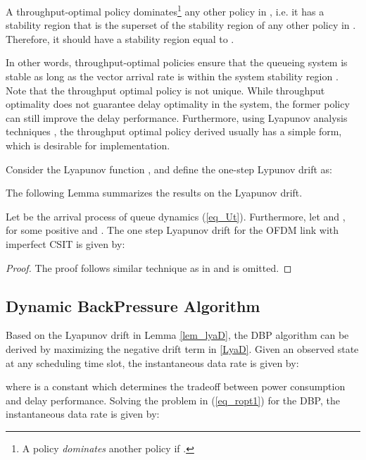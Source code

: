 \documentclass[11pt,journal, onecolumn]{./IEEEtran}
\newcommand{\red}{\color{black}}
\begin{document}
\begin{Definition} A throughput-optimal policy dominates\footnote{A policy  \emph{dominates} another policy  if .} any other policy in , i.e. it has a stability region that is the superset of the stability region of any other policy in . Therefore, it should have a stability region equal to . ~\hfill\IEEEQED
\end{Definition}

In  other  words,  throughput-optimal  policies  ensure  that  the  queueing  system  is  stable  as long as the vector arrival rate is within the system stability region . Note that the throughput optimal policy is not unique. While throughput optimality does not guarantee delay optimality in the system, the former policy can still improve the delay performance. Furthermore, using Lyapunov analysis techniques \cite{georgiadis_resource_2006}, the throughput optimal policy derived usually has a simple form, which is desirable for implementation.



Consider the Lyapunov function  \cite{andrews_scheduling_2004},
and define the one-step Lypunov drift  as:


The following Lemma summarizes the results on the Lyapunov drift. {\red
\begin{Lemma}\label{lem_lyaD} Let  be the arrival process of queue dynamics (\ref{eq_Ut}). Furthermore, let  and , for some positive  and . The one step Lyapunov drift for the OFDM link with imperfect CSIT is given by:

\end{Lemma}
\begin{proof}
The proof follows similar technique as in \cite{georgiadis_resource_2006} and is omitted.
\end{proof}
}


\subsection{Dynamic BackPressure Algorithm}
Based on the Lyapunov drift  in Lemma \ref{lem_lyaD}, the DBP algorithm can be derived by maximizing the negative drift term in \eqref{LyaD}. Given an observed state  at any scheduling time slot, the instantaneous data rate  is given by:

where  is a constant which determines the tradeoff between power consumption and delay performance. Solving the problem in (\ref{eq_ropt1}) for the DBP, the instantaneous data rate  is given by:
\end{document}
